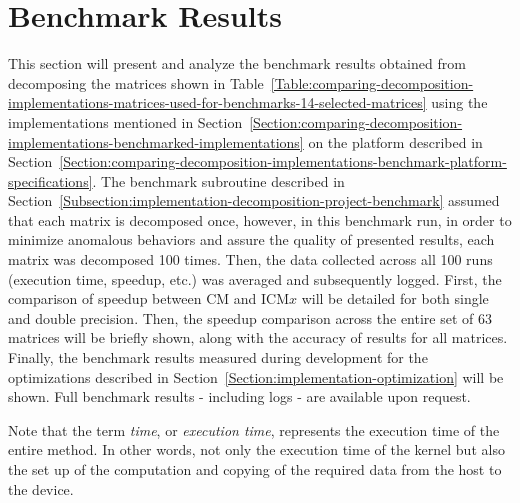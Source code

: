 \section{Benchmark Results}\label{Section:comparing-decomposition-implementations-benchmark-results}
This section will present and analyze the benchmark results obtained from decomposing the matrices shown in Table~\ref{Table:comparing-decomposition-implementations-matrices-used-for-benchmarks-14-selected-matrices} using the implementations mentioned in Section~\ref{Section:comparing-decomposition-implementations-benchmarked-implementations} on the platform described in Section~\ref{Section:comparing-decomposition-implementations-benchmark-platform-specifications}. The benchmark subroutine described in Section~\ref{Subsection:implementation-decomposition-project-benchmark} assumed that each matrix is decomposed once, however, in this benchmark run, in order to minimize anomalous behaviors and assure the quality of presented results, each matrix was decomposed 100 times. Then, the data collected across all 100 runs (execution time, speedup, etc.) was averaged and subsequently logged. First, the comparison of speedup between CM and ICM$ x $ will be detailed for both single and double precision. Then, the speedup comparison across the entire set of 63 matrices will be briefly shown, along with the accuracy of results for all matrices. Finally, the benchmark results measured during development for the optimizations described in Section~\ref{Section:implementation-optimization} will be shown. Full benchmark results - including logs - are available upon request.
\par Note that the term \textit{time}, or \textit{execution time}, represents the execution time of the entire  method. In other words, not only the execution time of the kernel but also the set up of the computation and copying of the required data from the host to the device.

